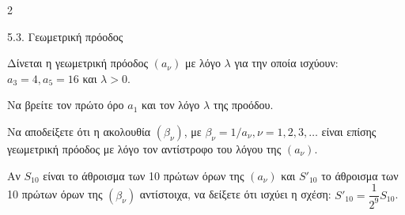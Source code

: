 \begin{ylh}{2}
    \item 5.3. Γεωμετρική πρόοδος
\end{ylh}
Δίνεται η γεωμετρική πρόοδος $(a_\nu)$ με λόγο $\lambda$ για την οποία ισχύουν: $a_3 = 4, a_5 = 16$ και $\lambda > 0$.

\begin{alist}
\item Να βρείτε τον πρώτο όρο $a_1$ και τον λόγο $\lambda$ της προόδου. 
\item Να αποδείξετε ότι η ακολουθία $(\beta_\nu)$, με $\beta_\nu = 1/a_\nu, \nu = 1, 2, 3, \dots$ είναι επίσης γεωμετρική πρόοδος με λόγο τον αντίστροφο του λόγου της $(a_\nu)$. 
\item Αν $S_{10}$ είναι το άθροισμα των 10 πρώτων όρων της $(a_\nu)$ και $S'_{10}$ το άθροισμα των 10 πρώτων όρων της $(\beta_\nu)$ αντίστοιχα, να δείξετε ότι ισχύει η σχέση: $S'_{10} = \dfrac{1}{2^9} S_{10}$. 
\end{alist}


